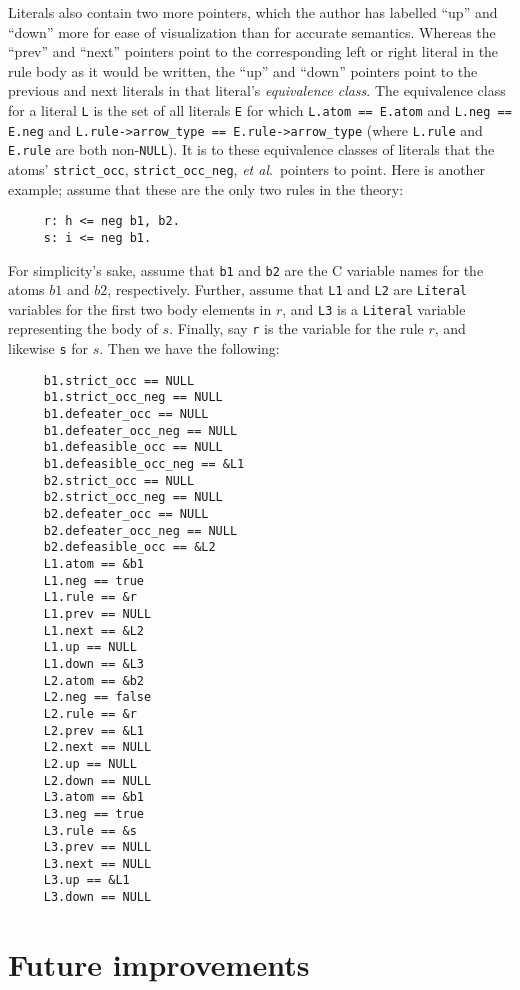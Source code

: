 \documentclass[a4paper,10pt,twocolumn]{article}
\begin{document}
Literals also contain two more pointers, which the author has labelled
``up'' and ``down'' more for ease of visualization than for accurate
semantics. Whereas the ``prev'' and ``next'' pointers point to the
corresponding left or right literal in the rule body as it would be
written, the ``up'' and ``down'' pointers point to the previous and
next literals in that literal's \emph{equivalence class}. The
equivalence class for a literal \texttt{L} is the set of all literals
\texttt{E} for which \texttt{L.atom == E.atom} and \texttt{L.neg ==
  E.neg} and \texttt{L.rule->arrow\_type == E.rule->arrow\_type}
(where \texttt{L.rule} and \texttt{E.rule} are both
non-\texttt{NULL}). It is to these equivalence classes of literals
that the atoms' \texttt{strict\_occ}, \texttt{strict\_occ\_neg},
\textit{et al}.~pointers to point. Here is another example; assume
that these are the only two rules in the theory:
\begin{verbatim}
     r: h <= neg b1, b2.
     s: i <= neg b1.
\end{verbatim}
For simplicity's sake, assume that \texttt{b1} and \texttt{b2} are the
C variable names for the atoms $b1$ and $b2$, respectively. Further,
assume that \texttt{L1} and \texttt{L2} are \texttt{Literal} variables
for the first two body elements in $r$, and \texttt{L3} is a
\texttt{Literal} variable representing the body of $s$. Finally, say
\texttt{r} is the variable for the rule $r$, and likewise \texttt{s}
for $s$. Then we have the following:
\begin{verbatim}
     b1.strict_occ == NULL
     b1.strict_occ_neg == NULL
     b1.defeater_occ == NULL
     b1.defeater_occ_neg == NULL
     b1.defeasible_occ == NULL
     b1.defeasible_occ_neg == &L1
     b2.strict_occ == NULL
     b2.strict_occ_neg == NULL
     b2.defeater_occ == NULL
     b2.defeater_occ_neg == NULL
     b2.defeasible_occ == &L2
     L1.atom == &b1
     L1.neg == true
     L1.rule == &r
     L1.prev == NULL
     L1.next == &L2
     L1.up == NULL
     L1.down == &L3
     L2.atom == &b2
     L2.neg == false
     L2.rule == &r
     L2.prev == &L1
     L2.next == NULL
     L2.up == NULL
     L2.down == NULL
     L3.atom == &b1
     L3.neg == true
     L3.rule == &s
     L3.prev == NULL
     L3.next == NULL
     L3.up == &L1
     L3.down == NULL
\end{verbatim}

\section{Future improvements}
\end{document}
